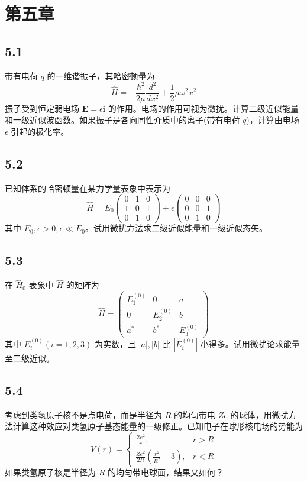 \section{第五章}

\subsection{5.1}
带有电荷 $q$ 的一维谐振子，其哈密顿量为
$$\hat{H} = -\frac{\hbar^{2}}{2\mu} \frac{d^{2}}{dx^{2}} + \frac{1}{2} \mu \omega^{2} x^{2}$$
振子受到恒定弱电场 $\mathbf{E} = \epsilon \mathbf{i}$ 的作用。电场的作用可视为微扰。计算二级近似能量和一级近似波函数。如果振子是各向同性介质中的离子(带有电荷 $q$)，计算由电场 $\epsilon$ 引起的极化率。

\subsection{5.2}
已知体系的哈密顿量在某力学量表象中表示为
$$\hat{H} = E_0 \begin{pmatrix} 0 & 1 & 0 \\ 1 & 0 & 1 \\ 0 & 1 & 0 \end{pmatrix} + \epsilon \begin{pmatrix} 0 & 0 & 0 \\ 0 & 0 & 1 \\ 0 & 1 & 0 \end{pmatrix}$$
其中 $E_0, \epsilon > 0, \epsilon \ll E_0$。试用微扰方法求二级近似能量和一级近似态矢。

\subsection{5.3}
在 $\hat{H}_0$ 表象中 $\hat{H}$ 的矩阵为
$$\hat{H} = \begin{pmatrix} E_1^{(0)} & 0 & a \\ 0 & E_2^{(0)} & b \\ a^* & b^* & E_3^{(0)} \end{pmatrix}$$
其中 $E_i^{(0)}(i=1,2,3)$ 为实数，且 $|a|, |b|$ 比 $|E_i^{(0)}|$ 小得多。试用微扰论求能量至二级近似。

\subsection{5.4}
考虑到类氢原子核不是点电荷，而是半径为 $R$ 的均匀带电 $Ze$ 的球体，用微扰方法计算这种效应对类氢原子基态能量的一级修正。已知电子在球形核电场的势能为
$$V(r) = \begin{cases} \frac{Ze^2}{r}, & r > R \\ \frac{Ze^2}{2R} \left( \frac{r^2}{R^2} - 3 \right), & r < R \end{cases}$$
如果类氢原子核是半径为 $R$ 的均匀带电球面，结果又如何？

